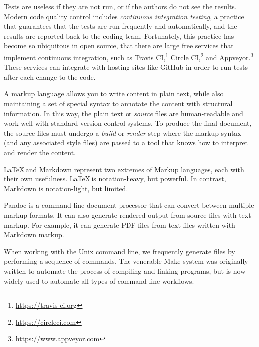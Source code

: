 Tests are useless if they are not run, or if the authors do not see the
results.  Modern code quality control includes \emph{continuous integration
testing}, a practice that guarantees that the tests are run frequently and
automatically, and the results are reported back to the coding team.
Fortunately, this practice has become so ubiquitous in open source, that there
are large free services that implement continuous integration, such as Travis
CI,\footnote{\url{https://travis-ci.org}\label{travis-ci}} Circle
CI,\footnote{\url{https://circleci.com}} and
Appveyor.\footnote{\url{https://www.appveyor.com}}  These services can
integrate with hosting sites like GitHub in order to run tests after each
change to the code.

A markup language allows you to write content in plain text, while also
maintaining a set of special syntax to annotate the content with structural
information.
In this way, the plain text or \emph{source} files are human-readable and work
well with standard version control systems.
To produce the final document, the source files must undergo a \emph{build} or
\emph{render}
step where the markup syntax (and any associated style files) are passed to a
tool that knows how to interpret and render the content.

\LaTeX\,and Markdown represent two extremes of Markup languages, each
with their own usefulness.
\LaTeX\,is notation-heavy, but powerful.
In contrast, Markdown is notation-light, but limited.

Pandoc is a command line document processor that can convert between multiple
markup formats.  It can also generate rendered output from source files with
text markup.  For example, it can generate PDF files from text files written
with Markdown markup.

When working with the Unix command line, we frequently generate files
by performing a sequence of commands.
The venerable Make system was originally written to automate the process
of compiling and linking programs, but is now widely used to
automate all types of command line workflows.

